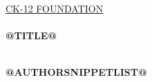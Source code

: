 \documentclass[xetex,11pt,twoside,openany]{book}
\renewcommand{\LARGE}{\fontsize{16}{18}\selectfont}
\begin{document}
\begin{titlepage}
\begin{center}
\textsc{\href{http://www.ck12.org}{\fontsize{18}{24}\selectfont CK-12 F\fontsize{14}{24}\selectfont OUNDATION}}\\[1.5cm]
 
\HRule\hrulefill \\[0.8cm]
\linespread{1.1}
\Huge{} \textbf{@TITLE@}
\linespread{1.0}
\\
\HRule \hrulefill
~\vfill
\begin{minipage}[b]{0.8\textwidth}
\begin{center} \Large
\textbf{@AUTHORSNIPPETLIST@}
\end{center}
\end{minipage}
 
 
\end{center}
 
\end{titlepage}
\newpage
~\vfill
\thispagestyle{empty}
\end{document}
